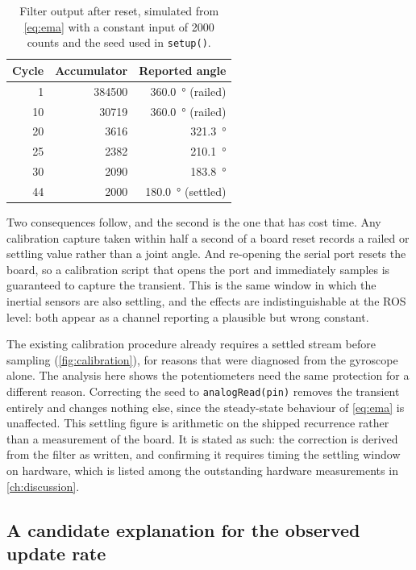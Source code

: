 \begin{table}[htbp]
  \centering
  \caption{Filter output after reset, simulated from \cref{eq:ema} with a
  constant input of \num{2000} counts and the seed used in \texttt{setup()}.}
  \label{tab:transient}
  \begin{tabular}{@{}rrr@{}}
    \toprule
    Cycle & Accumulator & Reported angle \\
    \midrule
     1 & \num{384500} & \SI{360.0}{\degree} (railed) \\
    10 & \num{30719}  & \SI{360.0}{\degree} (railed) \\
    20 & \num{3616}   & \SI{321.3}{\degree} \\
    25 & \num{2382}   & \SI{210.1}{\degree} \\
    30 & \num{2090}   & \SI{183.8}{\degree} \\
    44 & \num{2000}   & \SI{180.0}{\degree} (settled) \\
    \bottomrule
  \end{tabular}
\end{table}

Two consequences follow, and the second is the one that has cost time. Any
calibration capture taken within half a second of a board reset records a
railed or settling value rather than a joint angle. And re-opening the serial
port resets the board, so a calibration script that opens the port and
immediately samples is guaranteed to capture the transient. This is the same
window in which the inertial sensors are also settling, and the effects are
indistinguishable at the ROS level: both appear as a channel reporting a
plausible but wrong constant.

The existing calibration procedure already requires a settled stream before
sampling (\cref{fig:calibration}), for reasons that were diagnosed from the
gyroscope alone. The analysis here shows the potentiometers need the same
protection for a different reason. Correcting the seed to
\texttt{analogRead(pin)} removes the transient entirely and changes nothing
else, since the steady-state behaviour of \cref{eq:ema} is unaffected.
This settling figure is arithmetic on the shipped recurrence rather than a
measurement of the board. It is stated as such: the correction is derived
from the filter as written, and confirming it requires timing the settling
window on hardware, which is listed among the outstanding hardware
measurements in \cref{ch:discussion}.

\subsection{A candidate explanation for the observed update rate}

